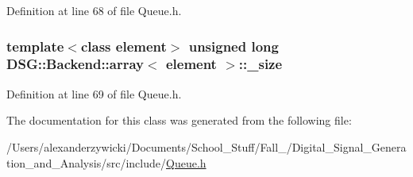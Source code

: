Definition at line 68 of file Queue.\+h.

\hypertarget{classDSG_1_1Backend_1_1array_a44349f32c09ebb31d5eadbe9a222cba2}{
\subsubsection[{\+\_\+size}]{\setlength{\rightskip}{0pt plus 5cm}template$<$class element$>$ unsigned long {\bf D\+S\+G\+::\+Backend\+::array}$<$ element $>$\+::\+\_\+size\hspace{0.3cm}{\ttfamily [protected]}}}\label{classDSG_1_1Backend_1_1array_a44349f32c09ebb31d5eadbe9a222cba2}


Definition at line 69 of file Queue.\+h.



The documentation for this class was generated from the following file\+:\begin{DoxyCompactItemize}
\item 
/\+Users/alexanderzywicki/\+Documents/\+School\+\_\+\+Stuff/\+Fall\+\_/\+Digital\+\_\+\+Signal\+\_\+\+Generation\+\_\+and\+\_\+\+Analysis/src/include/\hyperlink{Queue_8h}{Queue.\+h}\end{DoxyCompactItemize}
